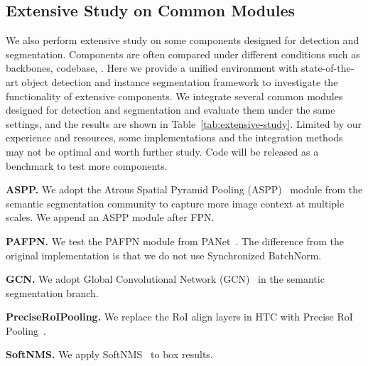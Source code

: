 \documentclass[10pt,twocolumn,letterpaper]{article}
\begin{document}
\subsection{Extensive Study on Common Modules}
We also perform extensive study on some components designed for detection and segmentation.
Components are often compared under different conditions such as backbones, codebase, \etc.
Here we provide a unified environment with state-of-the-art object detection and
instance segmentation framework to investigate the functionality of extensive components.
We integrate several common modules designed for detection and segmentation
and evaluate them under the same settings, and the results are shown in Table~\ref{tab:extensive-study}.
Limited by our experience and resources, some implementations and the integration
methods may not be optimal and worth further study.
Code will be released as a benchmark to test more components.

\noindent\textbf{ASPP.}
We adopt the Atrous Spatial Pyramid Pooling (ASPP)~\cite{chen2018deeplab} module
from the semantic segmentation community to capture more image context at multiple scales.
We append an ASPP module after FPN.

\noindent\textbf{PAFPN.}
We test the PAFPN module from PANet~\cite{liu2018path}. The difference from
the original implementation is that we do not use Synchronized BatchNorm.

\noindent\textbf{GCN.}
We adopt Global Convolutional Network (GCN)~\cite{peng2017large} in the semantic segmentation branch.

\noindent\textbf{PreciseRoIPooling.}
We replace the RoI align layers in HTC with Precise RoI Pooling~\cite{jiang2018acquisition}.

\noindent\textbf{SoftNMS.}
We apply SoftNMS~\cite{bodla2017soft} to box results.
\end{document}
